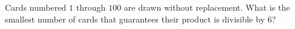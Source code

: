 Cards numbered $1$ through $100$ are drawn without replacement. What is the smallest number of cards that guarantees their product is divisible by $6$?
